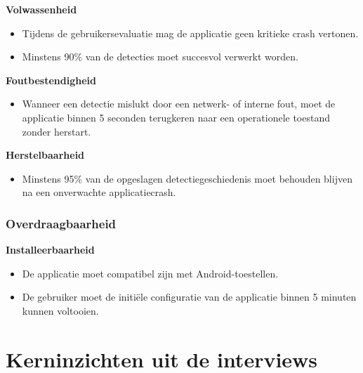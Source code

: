 \hspace*{1.5em}\textbf{Volwassenheid}

\begin{itemize}
    \item Tijdens de gebruikersevaluatie mag de applicatie geen kritieke crash vertonen.
    \item Minstens 90\% van de detecties moet succesvol verwerkt worden.
\end{itemize}

\vspace{0.5em}

\hspace*{1.5em}\textbf{Foutbestendigheid}

\begin{itemize}
    \item Wanneer een detectie mislukt door een netwerk- of interne fout, moet de applicatie binnen 5 seconden terugkeren naar een operationele toestand zonder herstart.
\end{itemize}

\vspace{0.5em}

\hspace*{1.5em}\textbf{Herstelbaarheid}

\begin{itemize}
    \item Minstens 95\% van de opgeslagen detectiegeschiedenis moet behouden blijven na een onverwachte applicatiecrash.
\end{itemize}

\vspace{1em}

\subsubsection{Overdraagbaarheid}
\vspace{1em}

\hspace*{1.5em}\textbf{Installeerbaarheid}

\begin{itemize}
    \item De applicatie moet compatibel zijn met Android-toestellen.
    \item De gebruiker moet de initiële configuratie van de applicatie binnen 5 minuten kunnen voltooien.
\end{itemize}

\newpage

\section{Kerninzichten uit de interviews}
\label{sec:interviews-inzichten}

